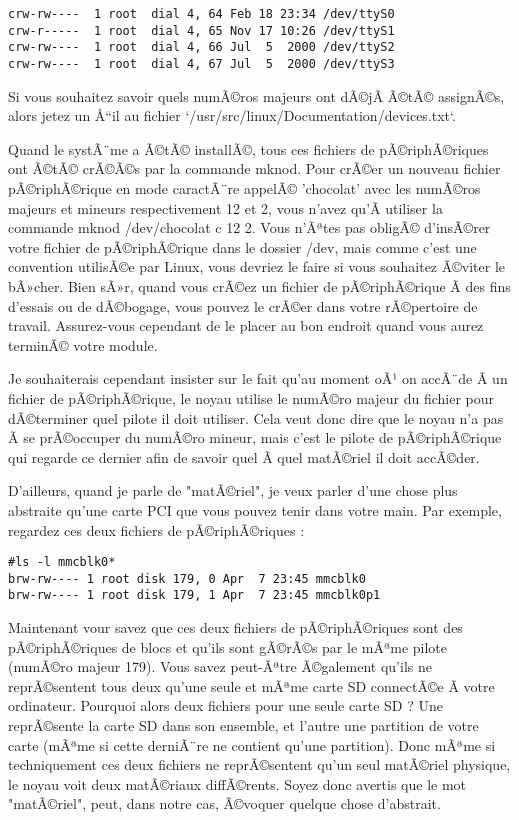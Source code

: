 \documentclass[11pt]{article}
\begin{document}
\begin{itemize}
\begin{verbatim}
crw-rw----  1 root  dial 4, 64 Feb 18 23:34 /dev/ttyS0
crw-r-----  1 root  dial 4, 65 Nov 17 10:26 /dev/ttyS1
crw-rw----  1 root  dial 4, 66 Jul  5  2000 /dev/ttyS2
crw-rw----  1 root  dial 4, 67 Jul  5  2000 /dev/ttyS3
\end{verbatim}

Si vous souhaitez savoir quels numÃ©ros majeurs ont dÃ©jÃ  Ã©tÃ© assignÃ©s, alors jetez un Å“il au fichier `/usr/src/linux/Documentation/devices.txt`.

Quand le systÃ¨me a Ã©tÃ© installÃ©, tous ces fichiers de pÃ©riphÃ©riques ont Ã©tÃ© crÃ©Ã©s par la commande mknod. Pour crÃ©er un nouveau fichier pÃ©riphÃ©rique en mode caractÃ¨re appelÃ© 'chocolat' avec les numÃ©ros majeurs et mineurs respectivement 12 et 2, vous n'avez qu'Ã  utiliser la commande mknod /dev/chocolat c 12 2. Vous n'Ãªtes pas obligÃ© d'insÃ©rer votre fichier de pÃ©riphÃ©rique dans le dossier /dev, mais comme c'est une convention utilisÃ©e par Linux, vous devriez le faire si vous souhaitez Ã©viter le bÃ»cher. Bien sÃ»r, quand vous crÃ©ez un fichier de pÃ©riphÃ©rique Ã  des fins d'essais ou de dÃ©bogage, vous pouvez le crÃ©er dans votre rÃ©pertoire de travail. Assurez-vous cependant de le placer au bon endroit quand vous aurez terminÃ© votre module.

Je souhaiterais cependant insister sur le fait qu'au moment oÃ¹ on accÃ¨de Ã  un fichier de pÃ©riphÃ©rique, le noyau utilise le numÃ©ro majeur du fichier pour dÃ©terminer quel pilote il doit utiliser. Cela veut donc dire que le noyau n'a pas Ã  se prÃ©occuper du numÃ©ro mineur, mais c'est le pilote de pÃ©riphÃ©rique qui regarde ce dernier afin de savoir quel Ã  quel matÃ©riel il doit accÃ©der.

D'ailleurs, quand je parle de "matÃ©riel", je veux parler d'une chose plus abstraite qu'une carte PCI que vous pouvez tenir dans votre main. Par exemple, regardez ces deux fichiers de pÃ©riphÃ©riques :

\begin{verbatim}
#ls -l mmcblk0*
brw-rw---- 1 root disk 179, 0 Apr  7 23:45 mmcblk0
brw-rw---- 1 root disk 179, 1 Apr  7 23:45 mmcblk0p1
\end{verbatim}

Maintenant vour savez que ces deux fichiers de pÃ©riphÃ©riques sont des pÃ©riphÃ©riques de blocs et qu'ils sont gÃ©rÃ©s par le mÃªme pilote (numÃ©ro majeur 179). Vous savez peut-Ãªtre Ã©galement qu'ils ne reprÃ©sentent tous deux qu'une seule et mÃªme carte SD connectÃ©e Ã  votre ordinateur. Pourquoi alors deux fichiers pour une seule carte SD ? Une reprÃ©sente la carte SD dans son ensemble, et l'autre une partition de votre carte (mÃªme si cette derniÃ¨re ne contient qu'une partition). Donc mÃªme si techniquement ces deux fichiers ne reprÃ©sentent qu'un seul matÃ©riel physique, le noyau voit deux matÃ©riaux diffÃ©rents. Soyez donc avertis que le mot "matÃ©riel", peut, dans notre cas, Ã©voquer quelque chose d'abstrait.
\end{itemize}
\end{document}

